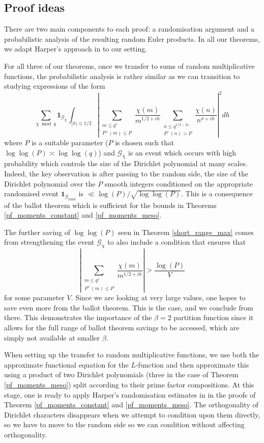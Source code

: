 \documentclass[reqno]{amsart}
\theoremstyle{definition}
\theoremstyle{remark}
\numberwithin{equation}{section}
\theoremstyle{remark}
\begin{document}
\subsection{Proof ideas}
There are two main components to each proof: a randomisation argument and a probabilistic analysis of the resulting random Euler products. In all our theorems, we adapt Harper's approach in \cite{harper2019partition} to our setting. \par
For all three of our theorems, once we transfer to sums of random multiplicative functions, the probabilistic analysis is rather similar as we can transition to studying expressions of the form
\begin{equation}\label{heuristic_quantity}
    \sum_{\chi \bmod{q}}\mathbf{1}_{\mathcal{G}_\chi}\int_{|h| \leq 1/2}|\sum_{\substack{m \leq q^{\varepsilon} \\ P^+(m) \leq P}}\frac{\chi(m)}{m^{1/2+ih}}\sum_{\substack{n \leq q^{1/2-2\varepsilon} \\ P^-(n) > P}}\frac{\chi(n)}{n^{\sigma+ih}}|^2dh
\end{equation}
where $P$ is a suitable parameter ($P$ is chosen such that $\log\log(P) \asymp \log\log(q)$) and $\mathcal{G}_\chi$ is an event which occurs with high probability which controls the size of the Dirichlet polynomial at many scales. Indeed, the key observation is after passing to the random side, the size of the Dirichlet polynomial over the $P$ smooth integers conditioned on the appropriate randomised event $\mathbf{1}_{\mathcal{G}_\text{rand}}$ is $\ll \log(P)/\sqrt{\log\log(P)}$. This is a consequence of the ballot theorem which is sufficient for the bounds in Theorems \ref{pf_moments_constant} and \ref{pf_moments_meso}.\par
The further saving of $\log\log(P)$ seen in Theorem \ref{short_range_max} comes from strengthening the event $\mathcal{G}_\chi$ to also include a condition that ensures that $$|\sum_{\substack{m \leq q^{\varepsilon} \\ P^+(m) \leq P}}\frac{\chi(m)}{m^{1/2+ih}}| > \frac{\log(P)}{V}$$
for some parameter $V$. Since we are looking at very large values, one hopes to save even more from the ballot theorem. This is the case, and we conclude from there. This demonstrates the importance of the $\beta=2$ partition function since it allows for the full range of ballot theorem savings to be accessed, which are simply not available at smaller $\beta$. \par
When setting up the transfer to random multiplicative functions, we use both the approximate functional equation for the $L$-function and then approximate this using a product of two Dirichlet polynomials (three in the case of Theorem \ref{pf_moments_meso}) split according to their prime factor compositions. At this stage, one is ready to apply Harper's randomisation estimates in \cite{harper2023typicalsizecharacterzeta} in the proofs of Theorem \ref{pf_moments_constant} and \ref{pf_moments_meso}. The orthogonality of Dirichlet characters disappears when we attempt to condition upon them directly, so we have to move to the random side so we can condition without affecting orthogonality. \par
\end{document}
